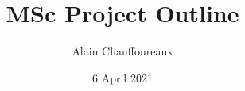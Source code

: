 

\newcommand{\thedoctitle}{MSc Project Outline}
\title{\textsf{\textbf{\thedoctitle}}}

\newcommand{\thedocauthor}{Alain Chauffoureaux}
\author{\textsf{\thedocauthor}}

\newcommand{\thedocdate}{6 April 2021}
\date{\textsf{\thedocdate}}
